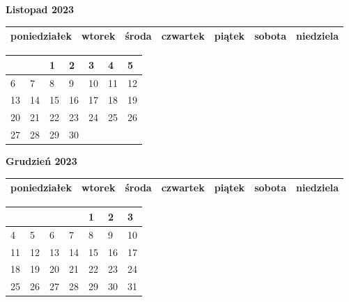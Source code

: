 \clearpage

\begin{landscape}
    \begin{center}
        \textbf{\huge{Listopad 2023}}
    \end{center}

    \vspace{-3mm}

    \thispagestyle{empty}
    \noindent
    \begin{tabularx}{28.7cm}{|Y|Y|Y|Y|Y|Y|Y|}
        \hline
poniedziałek & wtorek & środa & czwartek & piątek & sobota & niedziela \\ [-0.5mm]
        \hline
    \end{tabularx}

    \vspace{-0.5mm}

    \noindent
    \begin{tabularx}{28.7cm}{|X|X|X|X|X|X|X|}
        \hline
& & 1 & 2 & 3 & 4 & 5 \\ [31.0mm]
\hline
6 & 7 & 8 & 9 & 10 & 11 & 12 \\ [31.0mm]
\hline
13 & 14 & 15 & 16 & 17 & 18 & 19 \\ [31.0mm]
\hline
20 & 21 & 22 & 23 & 24 & 25 & 26 \\ [31.0mm]
\hline
27 & 28 & 29 & 30 & & & \\ [31.0mm]
\hline

    \end{tabularx}
\end{landscape}

\clearpage

\begin{landscape}
    \begin{center}
        \textbf{\huge{Grudzień 2023}}
    \end{center}

    \vspace{-3mm}

    \thispagestyle{empty}
    \noindent
    \begin{tabularx}{28.7cm}{|Y|Y|Y|Y|Y|Y|Y|}
        \hline
poniedziałek & wtorek & środa & czwartek & piątek & sobota & niedziela \\ [-0.5mm]
        \hline
    \end{tabularx}

    \vspace{-0.5mm}

    \noindent
    \begin{tabularx}{28.7cm}{|X|X|X|X|X|X|X|}
        \hline
& & & & 1 & 2 & 3 \\ [31.0mm]
\hline
4 & 5 & 6 & 7 & 8 & 9 & 10 \\ [31.0mm]
\hline
11 & 12 & 13 & 14 & 15 & 16 & 17 \\ [31.0mm]
\hline
18 & 19 & 20 & 21 & 22 & 23 & 24 \\ [31.0mm]
\hline
25 & 26 & 27 & 28 & 29 & 30 & 31 \\ [31.0mm]
\hline

    \end{tabularx}
\end{landscape}

\clearpage

